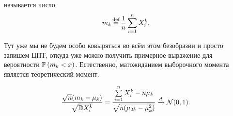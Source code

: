 \documentclass[../TV&MS.tex]{subfiles}
\begin{document}
\begin{Def}
     называется число
    \[
        m_k \myeq \frac{1}{n}\sum\limits_{i=1}^{n} X_i^{k}
    .\] 
\end{Def} 

Тут уже мы не будем особо ковыряться во всём этом безобразии и просто запишем ЦПТ, откуда уже можно получить примерное выражение для вероятности $\mathbb{P}\left( m_k < x \right)$.
Естественно, матожиданием выборочного момента является теоретический момент.

\begin{equation}
    \frac{\sqrt{n}(m_k - \mu_k)}{\sqrt{\mathbb{D} X_i^{k}}}
    = \frac{\sum\limits_{i=1}^{n} X_i^{k} - n\mu_k}{\sqrt{n(\mu_{2k} - \mu_k^2)}} \xrightarrow{d}
    \mathcal{N}(0, 1)
.\end{equation} 

\newpage
\end{document}
